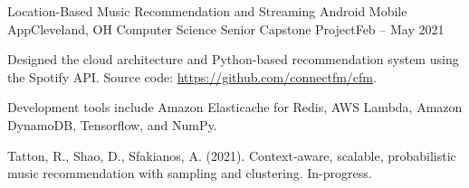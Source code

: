 \begin{ritemize}
{Location-Based Music Recommendation and Streaming Android Mobile App}{Cleveland, OH}
{Computer Science Senior Capstone Project}{Feb -- May 2021}
	\item Designed the cloud architecture and Python-based recommendation system using the Spotify API. Source code: \url{https://github.com/connectfm/cfm}.
	\item Development tools include Amazon Elasticache for Redis, AWS Lambda, Amazon DynamoDB, Tensorflow, and NumPy.
	\item Tatton, R., Shao, D., Sfakianos, A. (2021). Context-aware, scalable, probabilistic music recommendation with sampling and clustering. In-progress.
\end{ritemize}